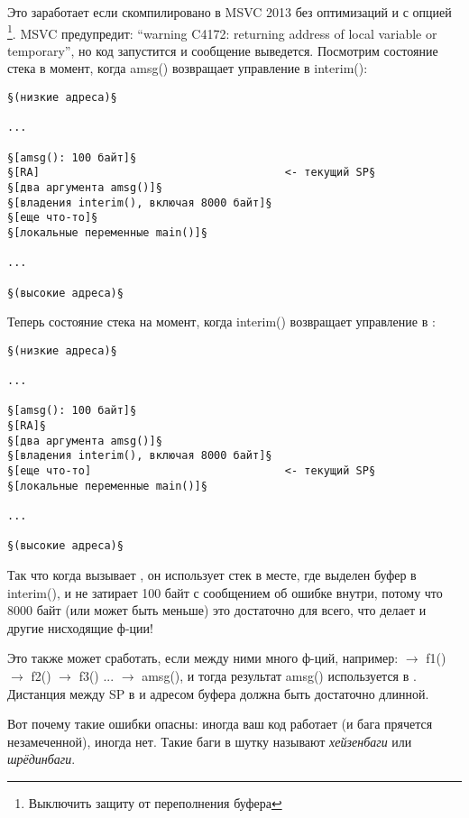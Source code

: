 Это заработает если скомпилировано в MSVC 2013 без оптимизаций и с опцией \footnote{Выключить защиту от переполнения буфера}.
MSVC предупредит: ``warning C4172: returning address of local variable or temporary'', но код запустится и сообщение выведется.
Посмотрим состояние стека в момент, когда amsg() возвращает управление в interim():

\begin{lstlisting}
§(низкие адреса)§

...

§[amsg(): 100 байт]§
§[RA]                                      <- текущий SP§
§[два аргумента amsg()]§
§[владения interim(), включая 8000 байт]§
§[еще что-то]§
§[локальные переменные main()]§

...

§(высокие адреса)§
\end{lstlisting}

Теперь состояние стека на момент, когда interim() возвращает управление в \main{}:

\begin{lstlisting}
§(низкие адреса)§

...

§[amsg(): 100 байт]§
§[RA]§
§[два аргумента amsg()]§
§[владения interim(), включая 8000 байт]§
§[еще что-то]                              <- текущий SP§
§[локальные переменные main()]§

...

§(высокие адреса)§
\end{lstlisting}

Так что когда \main вызывает \printf, он использует стек в месте, где выделен буфер в interim(),
и не затирает 100 байт с сообщением об ошибке внутри, потому что 8000 байт (или может быть меньше) это достаточно для всего,
что делает \printf и другие нисходящие ф-ции!

Это также может сработать, если между ними много ф-ций, например:
\main $\rightarrow$ f1() $\rightarrow$ f2() $\rightarrow$ f3() ... $\rightarrow$ amsg(),
и тогда результат amsg() используется в \main.
Дистанция между \ac{SP} в \main и адресом буфера  должна быть достаточно длинной.

Вот почему такие ошибки опасны: иногда ваш код работает (и бага прячется незамеченной), иногда нет.
\label{heisenbug}
Такие баги в шутку называют \emph{хейзенбаги} или \emph{шрёдинбаги}.

